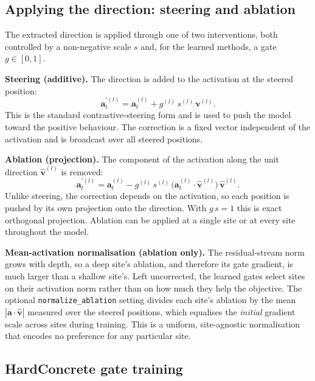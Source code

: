 \documentclass[a4paper,11pt]{article}
\begin{document}
\subsection{Applying the direction: steering and ablation}

The extracted direction is applied through one of two interventions, both controlled by a non-negative scale $s$ and, for the learned methods, a gate $g \in [0,1]$.

\textbf{Steering (additive).} The direction is added to the activation at the steered position:
\begin{equation}\label{eq:steer}
    \mathbf{a}_t^{\prime(l)} = \mathbf{a}_t^{(l)} + g^{(l)} \, s^{(l)} \, \mathbf{v}^{(l)}.
\end{equation}
This is the standard contrastive-steering form and is used to push the model toward the positive behaviour. The correction is a fixed vector independent of the activation and is broadcast over all steered positions.

\textbf{Ablation (projection).} The component of the activation along the unit direction $\hat{\mathbf{v}}^{(l)}$ is removed:
\begin{equation}\label{eq:ablate}
    \mathbf{a}_t^{\prime(l)} = \mathbf{a}_t^{(l)} - g^{(l)} \, s^{(l)} \, \big(\mathbf{a}_t^{(l)} \cdot \hat{\mathbf{v}}^{(l)}\big)\, \hat{\mathbf{v}}^{(l)}.
\end{equation}
Unlike steering, the correction depends on the activation, so each position is pushed by its own projection onto the direction. With $g \, s = 1$ this is exact orthogonal projection. Ablation can be applied at a single site or at every site throughout the model.

\textbf{Mean-activation normalisation (ablation only).} The residual-stream norm grows with depth, so a deep site's ablation, and therefore its gate gradient, is much larger than a shallow site's. Left uncorrected, the learned gates select sites on their activation norm rather than on how much they help the objective. The optional \texttt{normalize\_ablation} setting divides each site's ablation by the mean $|\mathbf{a} \cdot \hat{\mathbf{v}}|$ measured over the steered positions, which equalises the \emph{initial} gradient scale across sites during training. This is a uniform, site-agnostic normalisation that encodes no preference for any particular site.

\subsection{HardConcrete gate training}
\end{document}
